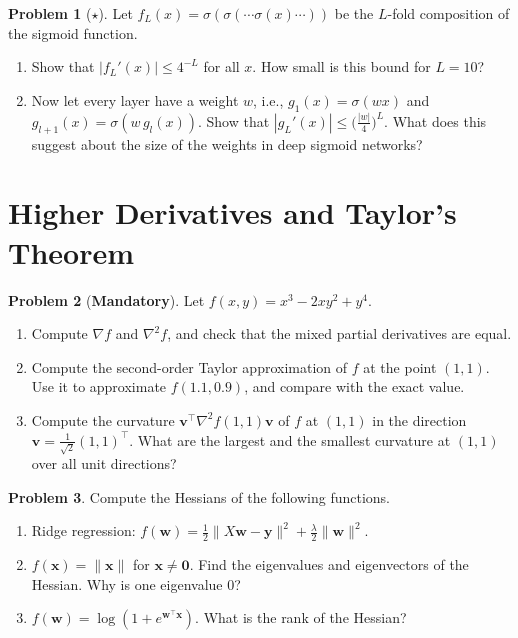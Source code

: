 \documentclass[11pt]{article}
\theoremstyle{definition}
\newtheorem{problem}{Problem}[section]
\newcommand{\mandatory}{\textcolor{red!70!black}{\textbf{Mandatory}}}
\newcommand{\norm}[1]{\lVert #1 \rVert}
\begin{document}
\begin{problem}[$\star$]\label{pr:vanishing}
    Let $f_L(x) = \sigma(\sigma(\cdots\sigma(x)\cdots))$ be the $L$-fold composition of the sigmoid function.
    \begin{enumerate}[label=(\alph*)]
        \item Show that $|f_L'(x)| \leq 4^{-L}$ for all $x$. How small is this bound for $L = 10$?
        \item Now let every layer have a weight $w$, i.e., $g_1(x) = \sigma(wx)$ and $g_{l+1}(x) = \sigma(w\,g_l(x))$. Show that $|g_L'(x)| \leq \big(\frac{|w|}{4}\big)^L$. What does this suggest about the size of the weights in deep sigmoid networks?
    \end{enumerate}
\end{problem}

\section{Higher Derivatives and Taylor's Theorem}

\begin{problem}[\mandatory]\label{pr:hessian-compute}
    Let $f(x, y) = x^3 - 2xy^2 + y^4$.
    \begin{enumerate}[label=(\alph*)]
        \item Compute $\nabla f$ and $\nabla^2 f$, and check that the mixed partial derivatives are equal.
        \item Compute the second-order Taylor approximation of $f$ at the point $(1, 1)$. Use it to approximate $f(1.1, 0.9)$, and compare with the exact value.
        \item Compute the curvature $\mathbf{v}^\top\nabla^2 f(1, 1)\mathbf{v}$ of $f$ at $(1, 1)$ in the direction $\mathbf{v} = \frac{1}{\sqrt{2}}(1, 1)^\top$. What are the largest and the smallest curvature at $(1, 1)$ over all unit directions?
    \end{enumerate}
\end{problem}

\begin{problem}\label{pr:hessians-ml}
    Compute the Hessians of the following functions.
    \begin{enumerate}[label=(\alph*)]
        \item Ridge regression: $f(\mathbf{w}) = \frac{1}{2}\norm{X\mathbf{w} - \mathbf{y}}^2 + \frac{\lambda}{2}\norm{\mathbf{w}}^2$.
        \item $f(\mathbf{x}) = \norm{\mathbf{x}}$ for $\mathbf{x} \neq \mathbf{0}$. Find the eigenvalues and eigenvectors of the Hessian. Why is one eigenvalue $0$?
        \item $f(\mathbf{w}) = \log(1 + e^{\mathbf{w}^\top\mathbf{x}})$. What is the rank of the Hessian?
    \end{enumerate}
\end{problem}
\end{document}
